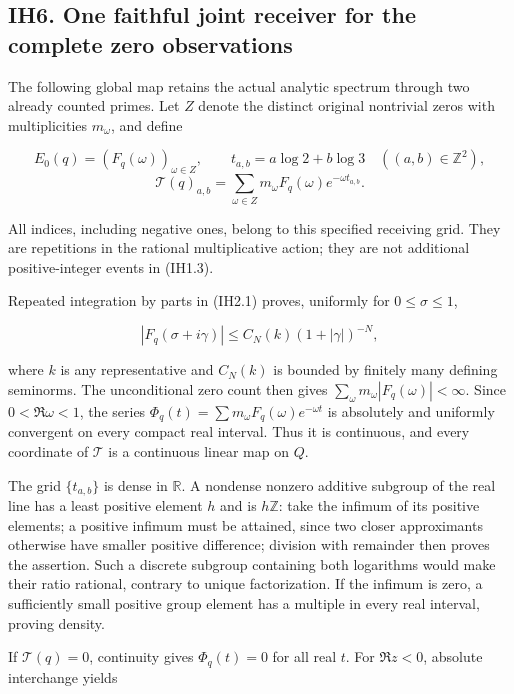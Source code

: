 \subsection{IH6. One faithful joint receiver for the complete zero
observations}\label{ih6.-one-faithful-joint-receiver-for-the-complete-zero-observations}

The following global map retains the actual analytic spectrum through
two already counted primes. Let \(Z\) denote the distinct original
nontrivial zeros with multiplicities \(m_\omega\), and define

\[
E_0(q)=(F_q(\omega))_{\omega\in Z},\qquad
t_{a,b}=a\log2+b\log3\quad((a,b)\in\mathbb Z^2),
\] \[
\mathcal T(q)_{a,b}
=\sum_{\omega\in Z}m_\omega F_q(\omega)e^{-\omega t_{a,b}}.
\tag{IH6.1}
\]

All indices, including negative ones, belong to this specified receiving
grid. They are repetitions in the rational multiplicative action; they
are not additional positive-integer events in (IH1.3).

Repeated integration by parts in (IH2.1) proves, uniformly for
\(0\le\sigma\le1\),

\[
|F_q(\sigma+i\gamma)|\le C_N(k)(1+|\gamma|)^{-N},
\tag{IH6.2}
\]

where \(k\) is any representative and \(C_N(k)\) is bounded by finitely
many defining seminorms. The unconditional zero count then gives
\(\sum_\omega m_\omega|F_q(\omega)|<\infty\). Since \(0<\Re\omega<1\),
the series \(\Phi_q(t)=\sum m_\omega F_q(\omega)e^{-\omega t}\) is
absolutely and uniformly convergent on every compact real interval. Thus
it is continuous, and every coordinate of \(\mathcal T\) is a continuous
linear map on \(Q\).

The grid \(\{t_{a,b}\}\) is dense in \(\mathbb R\). A nondense nonzero
additive subgroup of the real line has a least positive element \(h\)
and is \(h\mathbb Z\): take the infimum of its positive elements; a
positive infimum must be attained, since two closer approximants
otherwise have smaller positive difference; division with remainder then
proves the assertion. Such a discrete subgroup containing both
logarithms would make their ratio rational, contrary to unique
factorization. If the infimum is zero, a sufficiently small positive
group element has a multiple in every real interval, proving density.

If \(\mathcal T(q)=0\), continuity gives \(\Phi_q(t)=0\) for all real
\(t\). For \(\Re z<0\), absolute interchange yields


